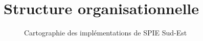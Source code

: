 
\section{Structure organisationnelle}

\begin{figure}[H]
    \label{fig-implem-spie}
    \noindent{}
    \caption{Cartographie des implémentations de SPIE Sud-Est}
\end{figure}

